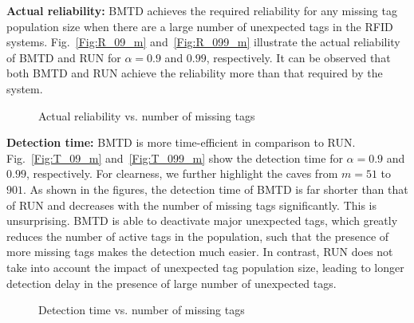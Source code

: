 \documentclass[10pt, twocolumn]{IEEEtran}
\begin{document}
\textbf{Actual reliability:}
BMTD achieves the required reliability for any missing tag population size when there are a large number of unexpected tags in the RFID systems.
Fig.~\ref{Fig:R_09_m} and~\ref{Fig:R_099_m} illustrate the actual reliability of BMTD and RUN for $\alpha=0.9$ and $0.99$, respectively. It can be observed that both BMTD and RUN achieve the reliability more than that required by the system.

\begin{figure}[htbp]
\centering
{}
\caption{Actual reliability vs. number of missing tags}
\label{Fig:R_m}
\end{figure}

\textbf{Detection time:}
BMTD is more time-efficient in comparison to RUN.
Fig.~\ref{Fig:T_09_m} and~\ref{Fig:T_099_m} show the detection time for $\alpha=0.9$ and $0.99$, respectively. For clearness, we further highlight the caves from $m=51$ to $901$.
As shown in the figures, the detection time of BMTD is far shorter than that of RUN and decreases with the number of missing tags significantly. This is unsurprising. BMTD is able to deactivate major unexpected tags, which greatly reduces the number of active tags in the population, such that the presence of more missing tags makes the detection much easier. In contrast, RUN does not take into account the impact of unexpected tag population size, leading to longer detection delay in the presence of large number of unexpected tags.


\begin{figure}[htbp]
\centering
{}
\caption{Detection time vs. number of missing tags}
\label{Fig:T_m}
\end{figure}
\end{document}
